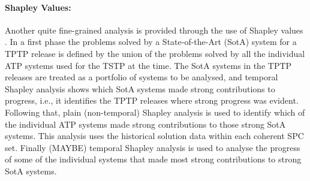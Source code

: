 \documentclass[runningheads]{llncs}
\begin{document}
\paragraph{Shapley Values:}
Another quite fine-grained analysis is provided through the use of Shapley values 
\cite{XH+12,FK+16,KF+19}.
In a first phase the problems solved by a State-of-the-Art (SotA) system for a TPTP release is 
defined by the union of the problems solved by all the individual ATP systems used for the TSTP 
at the time.
The SotA systems in the TPTP releases are treated as a portfolio of systems to be analysed, and 
temporal Shapley analysis shows which SotA systems made strong contributions to progress, i.e., it
identifies the TPTP releases where strong progress was evident.
Following that, plain (non-temporal) Shapley analysis is used to identify which of the individual 
ATP systems made strong contributions to those strong SotA systems.
This analysis uses the historical solution data within each coherent SPC set.
Finally (MAYBE) temporal Shapley analysis is used to analyse the progress of some of the
individual systems that made most strong contributions to strong SotA systems.
\end{document}

